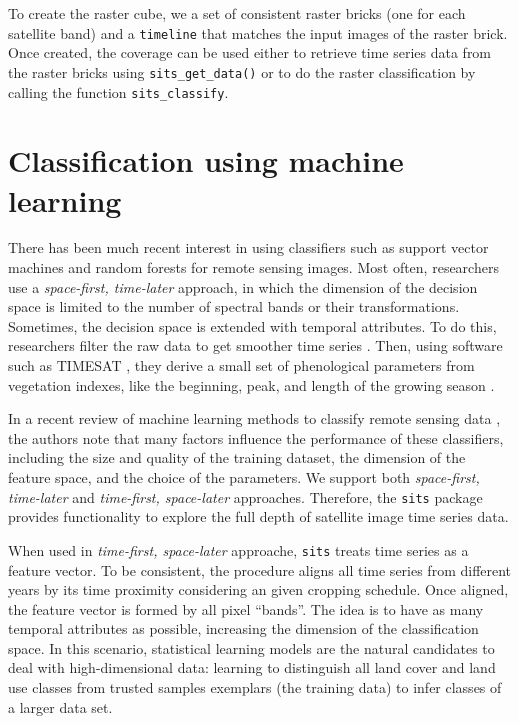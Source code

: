 \documentclass[a4paper,]{tufte-book}
\begin{document}
To create the raster cube, we a set of consistent raster bricks (one for each satellite band) and a \texttt{timeline} that matches the input images of the raster brick. Once created, the coverage can be used either to retrieve time series data from the raster bricks using \texttt{sits\_get\_data()} or to do the raster classification by calling the function \texttt{sits\_classify}.

\hypertarget{classification-using-machine-learning-1}{%
\section{Classification using machine learning}\label{classification-using-machine-learning-1}}

There has been much recent interest in using classifiers such as support vector machines \citep{Mountrakis2011} and random forests \citep{Belgiu2016} for remote sensing images. Most often, researchers use a \emph{space-first, time-later} approach, in which the dimension of the decision space is limited to the number of spectral bands or their transformations. Sometimes, the decision space is extended with temporal attributes. To do this, researchers filter the raw data to get smoother time series \citep{Brown2013, Kastens2017}. Then, using software such as TIMESAT \citep{Jonsson2004}, they derive a small set of phenological parameters from vegetation indexes, like the beginning, peak, and length of the growing season \citep{Estel2015, Pelletier2016}.

In a recent review of machine learning methods to classify remote sensing data \citep{Maxwell2018}, the authors note that many factors influence the performance of these classifiers, including the size and quality of the training dataset, the dimension of the feature space, and the choice of the parameters. We support both \emph{space-first, time-later} and \emph{time-first, space-later} approaches. Therefore, the \texttt{sits} package provides functionality to explore the full depth of satellite image time series data.

When used in \emph{time-first, space-later} approache, \texttt{sits} treats time series as a feature vector. To be consistent, the procedure aligns all time series from different years by its time proximity considering an given cropping schedule. Once aligned, the feature vector is formed by all pixel ``bands''. The idea is to have as many temporal attributes as possible, increasing the dimension of the classification space. In this scenario, statistical learning models are the natural candidates to deal with high-dimensional data: learning to distinguish all land cover and land use classes from trusted samples exemplars (the training data) to infer classes of a larger data set.
\end{document}
